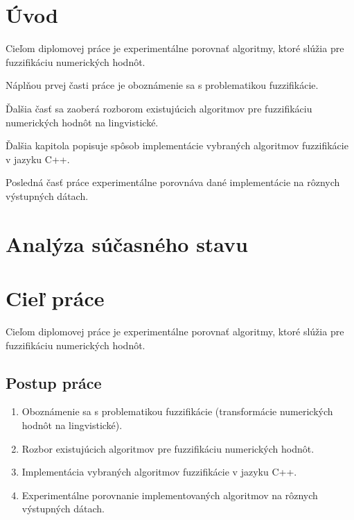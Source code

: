 \chapter*{Úvod}

Cieľom diplomovej práce je experimentálne porovnať algoritmy, ktoré slúžia pre fuzzifikáciu numerických hodnôt.

Náplňou prvej časti práce je oboznámenie sa s problematikou fuzzifikácie.  

Ďalšia časť sa zaoberá rozborom existujúcich algoritmov pre fuzzifikáciu numerických hodnôt na lingvistické. 

Ďalšia kapitola popisuje spôsob implementácie vybraných algoritmov fuzzifikácie v jazyku C++. 

Posledná časť práce experimentálne porovnáva dané implementácie na rôznych výstupných dátach. 


\chapter{Analýza súčasného stavu}



\chapter{Cieľ práce}
Cieľom diplomovej práce je experimentálne porovnať algoritmy, ktoré slúžia pre fuzzifikáciu numerických hodnôt.

\section*{Postup práce}
 
\begin{enumerate}
\item Oboznámenie sa s problematikou fuzzifikácie (transformácie numerických hodnôt na lingvistické).
\item Rozbor existujúcich algoritmov pre fuzzifikáciu numerických hodnôt.
\item  Implementácia vybraných algoritmov fuzzifikácie v jazyku C++.
\item  Experimentálne porovnanie implementovaných algoritmov na rôznych výstupných dátach.
\end{enumerate}

















